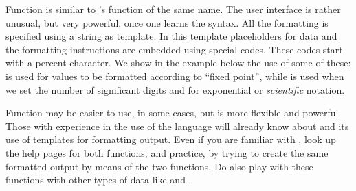 \documentclass[krantz2]{krantz}\usepackage{knitr}%
\begin{document}
Function  is similar to \Clang's function of the same name. The user interface is rather unusual, but very powerful, once one learns the syntax. All the formatting is specified using a  string as template. In this template placeholders for data and the formatting instructions are embedded using special codes. These codes start with a percent character. We show in the example below the use of some of these:  is used for  values to be formatted according to ``fixed point'', while  is used when we set the number of significant digits and  for exponential or \emph{scientific} notation.
\begin{knitrout}\footnotesize
{}\color{fgcolor}
\end{knitrout}

\begin{playground}
Function  may be easier to use, in some cases, but  is more flexible and powerful. Those with experience in the use of the \Clang language will already know about  and its use of templates for formatting output. Even if you are familiar with  \Clang, look up the help pages for both functions, and practice, by trying to create the same formatted output by means of the two functions. Do also play with these functions with other types of data like  and .
\end{playground}
\end{document}

